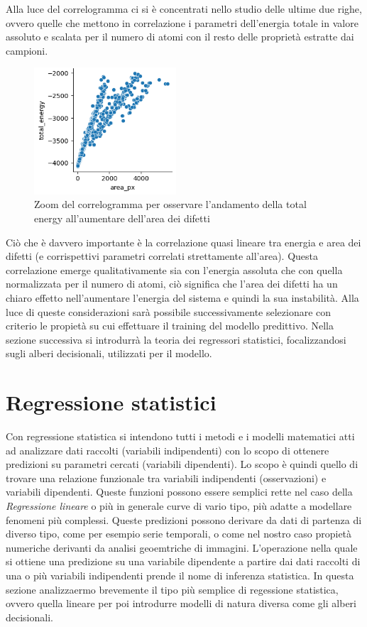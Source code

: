 \documentclass[12pt,a4paper,openright,twoside]{report}
\begin{document}
Alla luce del correlogramma ci si è concentrati nello studio delle ultime due righe, ovvero
quelle che mettono in correlazione i parametri dell’energia totale in valore assoluto e scalata per il numero di atomi con il resto delle proprietà estratte dai campioni.
\begin{center}
\begin{figure}[h]
\centering
\includegraphics[width=200px,keepaspectratio]{energy_vs_area.png}
\caption{Zoom del correlogramma per osservare l’andamento della total energy
all’aumentare dell’area dei difetti}
\end{figure}    
\end{center}
Ciò che è davvero importante è la correlazione quasi lineare tra energia e area dei difetti (e corrispettivi parametri correlati strettamente all’area).
Questa correlazione emerge qualitativamente sia con l’energia assoluta che con quella
normalizzata per il numero di atomi, ciò significa che l’area dei difetti ha un chiaro effetto nell’aumentare l’energia del sistema e quindi la sua instabilità.
Alla luce di queste considerazioni sarà possibile successivamente selezionare con criterio le propietà su cui effettuare il training del modello predittivo. 
Nella sezione successiva si introdurrà la teoria dei regressori statistici, focalizzandosi sugli alberi decisionali, utilizzati per il modello. 
\section{Regressione statistici}
Con regressione statistica si intendono tutti i metodi e i modelli matematici atti ad analizzare dati raccolti (variabili indipendenti) con lo scopo di ottenere predizioni su parametri cercati (variabili dipendenti). 
Lo scopo è quindi quello di trovare una relazione funzionale tra variabili indipendenti (osservazioni) e variabili dipendenti.
Queste funzioni possono essere semplici rette nel caso della \emph{Regressione lineare} o più in generale curve di vario tipo, più adatte a modellare fenomeni più complessi.
Queste predizioni possono derivare da dati di partenza di diverso tipo, come per esempio serie temporali, o come nel nostro caso propietà numeriche derivanti da analisi geoemtriche di immagini. L'operazione nella quale si ottiene una predizione su una variabile dipendente a partire dai dati raccolti di una o più variabili indipendenti prende il nome di inferenza statistica.
In questa sezione analizzaermo brevemente  il tipo più semplice di regessione statistica, ovvero quella lineare per poi introdurre modelli di natura diversa come gli alberi decisionali. 
\end{document}
